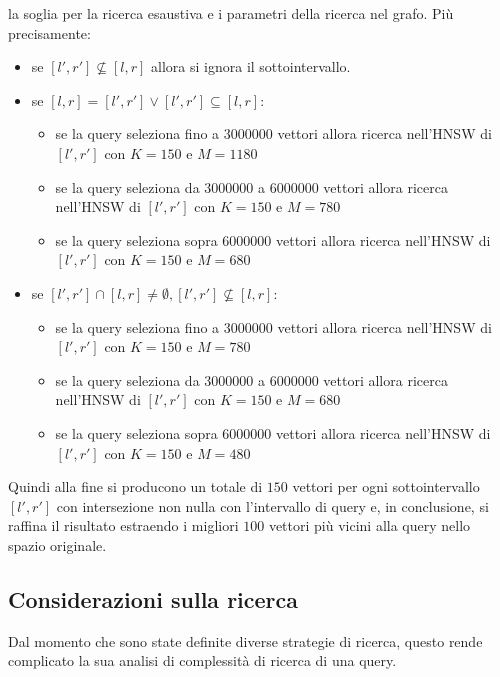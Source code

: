 \begin{itemize}
    la soglia per la ricerca esaustiva e i parametri della ricerca nel grafo. Più 
    precisamente:
    \begin{itemize}
        \item se $[l',r'] \not \subseteq [l,r]$ allora si ignora il sottointervallo.
        \item se $[l,r] = [l',r'] \lor  [l',r'] \subseteq [l,r]$:
        \begin{itemize}
            \item se la query seleziona fino a $3000000$ vettori allora ricerca 
            nell'HNSW di $[l',r']$ con $K=150$ e $M=1180$
            \item se la query seleziona da $3000000$ a $6000000$ vettori allora ricerca 
            nell'HNSW di $[l',r']$ con $K=150$ e $M=780$
            \item se la query seleziona sopra $6000000$ vettori allora ricerca 
            nell'HNSW di $[l',r']$ con $K=150$ e $M=680$
        \end{itemize}
        \item se $[l',r'] \cap [l,r] \ne \emptyset, [l',r'] \not \subseteq [l,r]$:
        \begin{itemize}
            \item se la query seleziona fino a $3000000$ vettori allora ricerca 
            nell'HNSW di $[l',r']$ con $K=150$ e $M=780$
            \item se la query seleziona da $3000000$ a $6000000$ vettori allora ricerca 
            nell'HNSW di $[l',r']$ con $K=150$ e $M=680$
            \item se la query seleziona sopra $6000000$ vettori allora ricerca 
            nell'HNSW di $[l',r']$ con $K=150$ e $M=480$
        \end{itemize}
    \end{itemize}
\end{itemize}

Quindi alla fine si producono un totale di $150$ vettori per ogni sottointervallo
$[l',r']$ con intersezione non nulla con l'intervallo di query e, in conclusione, 
si raffina il risultato estraendo i migliori $100$ vettori più vicini alla query 
nello spazio originale.   

\subsection{Considerazioni sulla ricerca}

Dal momento che sono state definite diverse strategie di ricerca, questo rende 
complicato la sua analisi di complessità di ricerca di una query.

